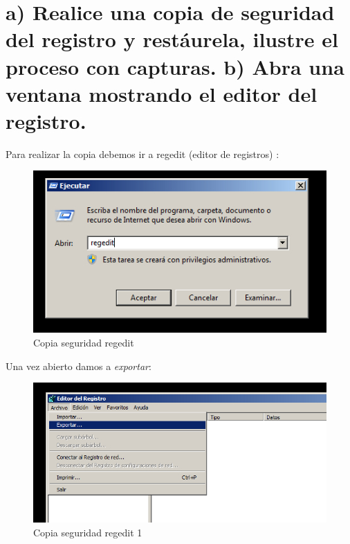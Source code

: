 \section[Cuestión 3]{a) Realice una copia de seguridad del registro y restáurela, ilustre el proceso con capturas. b) Abra una ventana mostrando el editor del	registro.}

Para realizar la copia debemos ir a regedit (editor de registros) \cite{regedit}:

\begin{figure}[H] %
	\centering
	\includegraphics[scale=0.5]{pics/reg}  %
	\caption{Copia seguridad regedit} \label{fig:reg}
\end{figure}

Una vez abierto damos a \textit{exportar}:

\begin{figure}[H] %
	\centering
	\includegraphics[scale=0.5]{pics/reg1}  %
	\caption{Copia seguridad regedit 1} \label{fig:reg1}
\end{figure}


